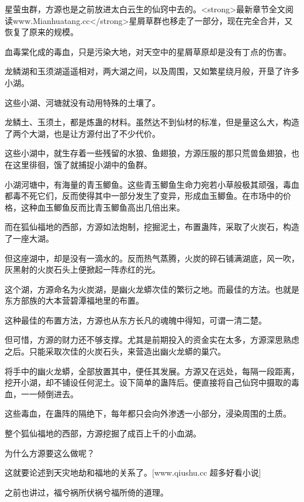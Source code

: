 
\begin{this_body}

星萤虫群，方源也是之前放进太白云生的仙窍中去的。<strong>最新章节全文阅读www.Mianhuatang.cc</strong>星屑草群也移走了一部分，现在完全合并，又恢复了原来的规模。

血毒棠化成的毒血，只是污染大地，对天空中的星屑草原却是没有丁点的伤害。

龙鳞湖和玉须湖遥遥相对，两大湖之间，以及周围，又如繁星绕月般，开垦了许多小湖。

这些小湖、河塘就没有动用特殊的土壤了。

龙鳞土、玉须土，都是炼蛊的材料。虽然达不到仙材的标准，但是量这么大，构造了两个大湖，也是让方源付出了不少代价。

这些小湖中，就生存着一些残留的水狼、鱼翅狼，方源压服的那只荒兽鱼翅狼，也在这里徘徊，饿了就捕捉小湖中的鱼群。

小湖河塘中，有海量的青玉鲫鱼。这些青玉鲫鱼生命力宛若小草般极其顽强，毒血都毒不死它们，反而使得其中一部分发生了变异，形成血玉鲫鱼。在市场中的价格，这种血玉鲫鱼反而比青玉鲫鱼高出几倍出来。

而在狐仙福地的西部，方源如法炮制，挖掘泥土，布置蛊阵，采取了火炭石，构造了一座大湖。

但这座湖中，却是没有一滴水的。反而热气蒸腾，火炭的碎石铺满湖底，风一吹，灰黑射的火炭石头上便掀起一阵赤红的光。

这个湖，方源命名为火炭湖，是幽火龙蟒次佳的繁衍之地。而最佳的方法。也就是东方部族的大本营碧潭福地里的布置。

这种最佳的布置方法，方源也从东方长凡的魂魄中得知，可谓一清二楚。

但可惜，方源的财力还不够支撑。尤其是前期投入的资金实在太多，方源深思熟虑之后。只能采取次佳的火炭石头，来营造出幽火龙蟒的巢穴。

将手中的幽火龙蟒，全部放置其中，便任其发展。方源又在远处，每隔一段距离，挖开小湖，却不铺设任何泥土。设下简单的蛊阵后。便直接将自己仙窍中摄取的毒血，一一倾倒进去。

这些毒血，在蛊阵的隔绝下，每年都只会向外渗透一小部分，浸染周围的土质。

整个狐仙福地的西部，方源挖掘了成百上千的小血湖。

为什么方源要这么做呢？

这就要论述到天灾地劫和福地的关系了。[www.qiushu.cc 超多好看小说]

之前也讲过，福兮祸所伏祸兮福所倚的道理。


\end{this_body}
